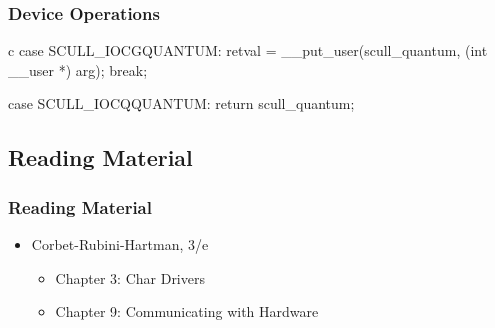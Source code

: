 \documentclass[dvipsnames]{beamer}
\begin{document}
\begin{frame}[fragile]
  \frametitle{Device Operations}

  \begin{example}
    \begin{pygments}{c}
case SCULL_IOCGQUANTUM:
    retval = __put_user(scull_quantum,
                        (int __user *) arg);
    break;

case SCULL_IOCQQUANTUM:
    return scull_quantum;
    \end{pygments}
  \end{example}
\end{frame}

\subsection*{Reading Material}

\begin{frame}
  \frametitle{Reading Material}

  \begin{itemize}
    \item Corbet-Rubini-Hartman, 3/e
    \begin{itemize}
      \item Chapter 3: \alert{Char Drivers}
      \item Chapter 9: \alert{Communicating with Hardware}
    \end{itemize}
  \end{itemize}
\end{frame}
\end{document}

